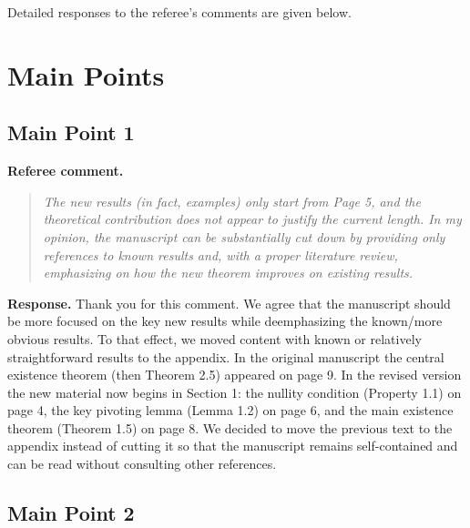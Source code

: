\documentclass[11pt]{article}
\newenvironment{refereecomment}
{\par\smallskip\noindent\textbf{\color{commentblue}Referee comment.}
\begin{quote}\itshape}
  {
\end{quote}}
\newenvironment{authorresponse}
{\par\smallskip\noindent\textbf{\color{responsegreen}Response.}}
{\par\smallskip}
\begin{document}
Detailed responses to the referee's comments are given below.

\section*{Main Points}

\subsection*{Main Point 1}

\begin{refereecomment}
  The new results (in fact, examples) only start from Page 5, and the theoretical contribution does not appear to justify the current length. In my opinion, the manuscript can be substantially cut down by providing only references to known results and, with a proper literature review, emphasizing on how the new theorem improves on existing results.
\end{refereecomment}

\begin{authorresponse}
  Thank you for this comment. We agree that the manuscript should be more focused on the key new results while deemphasizing the known/more obvious results. To that effect, we moved content with known or relatively straightforward results to the appendix. In the original manuscript the central existence theorem (then Theorem 2.5) appeared on page 9. In the revised version the new material now begins in Section 1: the nullity condition (Property 1.1) on page 4, the key pivoting lemma (Lemma 1.2) on page 6, and the main existence theorem (Theorem 1.5) on page 8. We decided to move the previous text to the appendix instead of cutting it so that the manuscript remains self-contained and can be read without consulting other references.
\end{authorresponse}

\subsection*{Main Point 2}
\end{document}
